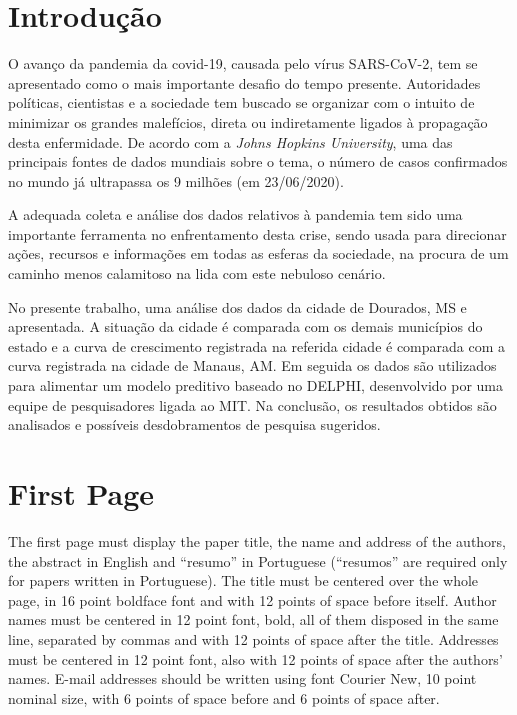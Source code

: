 \documentclass[12pt]{article}
\begin{document}
\section{Introdução}

O avanço da pandemia da covid-19, causada pelo vírus SARS-CoV-2, tem se apresentado como o mais importante desafio do tempo presente. Autoridades políticas, cientistas e a sociedade tem buscado se organizar com o intuito de minimizar os grandes malefícios, direta ou indiretamente ligados à propagação desta enfermidade. De acordo com a \textit{Johns Hopkins University}, uma das principais fontes de dados mundiais sobre o tema, o número de casos confirmados no mundo já ultrapassa os 9 milhões (em 23/06/2020).

A adequada coleta e análise dos dados relativos à pandemia tem sido uma importante ferramenta no enfrentamento desta crise, sendo usada para direcionar ações, recursos e informações em todas as esferas da sociedade, na procura de um caminho menos calamitoso na lida com este nebuloso cenário.

No presente trabalho, uma análise dos dados da cidade de Dourados, MS e apresentada. A situação da cidade é comparada com os demais municípios do estado e a curva de crescimento registrada na referida cidade é comparada com a curva registrada na cidade de Manaus, AM. Em seguida os dados são utilizados para alimentar um modelo preditivo baseado no DELPHI, desenvolvido por uma equipe de pesquisadores ligada ao MIT. Na conclusão, os resultados obtidos são analisados e possíveis desdobramentos de pesquisa sugeridos. 

\section{First Page} \label{sec:firstpage}

The first page must display the paper title, the name and address of the
authors, the abstract in English and ``resumo'' in Portuguese (``resumos'' are
required only for papers written in Portuguese). The title must be centered
over the whole page, in 16 point boldface font and with 12 points of space
before itself. Author names must be centered in 12 point font, bold, all of
them disposed in the same line, separated by commas and with 12 points of
space after the title. Addresses must be centered in 12 point font, also with
12 points of space after the authors' names. E-mail addresses should be
written using font Courier New, 10 point nominal size, with 6 points of space
before and 6 points of space after.
\end{document}
